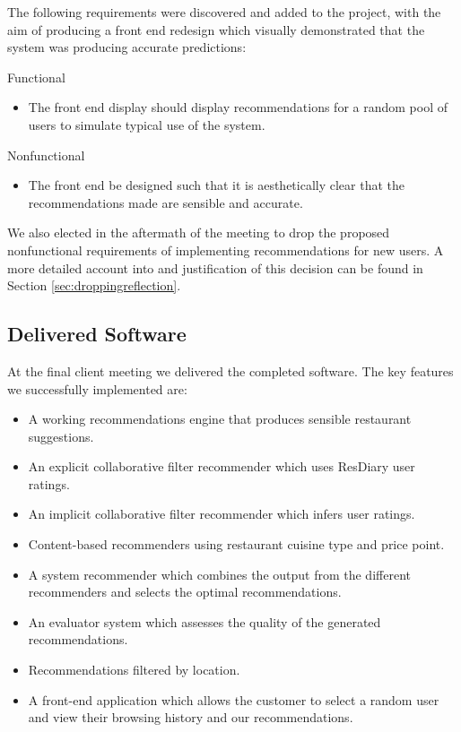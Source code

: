 \documentclass{l3proj}
\begin{document}
The following requirements were discovered and added to the project, with the aim of producing a front end redesign which visually demonstrated that the system was producing accurate predictions:

Functional
\begin{itemize}
\item The front end display should display recommendations for a random pool of users to simulate typical use of the system.
\end{itemize}

Nonfunctional
\begin{itemize}
\item The front end be designed such that it is aesthetically clear that the recommendations made are sensible and accurate.
\end{itemize}

We also elected in the aftermath of the meeting to drop the proposed nonfunctional requirements of implementing recommendations for new users. A more detailed account into and justification of this decision can be found in Section \ref{sec:droppingreflection}.

\subsection{Delivered Software}
\label{sec:finsoftware}

At the final client meeting we delivered the completed software. The key features we successfully implemented are:

\begin{itemize}
\item A working recommendations engine that produces sensible restaurant suggestions. 
\item An explicit collaborative filter recommender which uses ResDiary user ratings.
\item An implicit collaborative filter recommender which infers user ratings.
\item Content-based recommenders using restaurant cuisine type and price point.
\item A system recommender which combines the output from the different recommenders and selects the optimal recommendations.
\item An evaluator system which assesses the quality of the generated recommendations.
\item Recommendations filtered by location. 
\item A front-end application which allows the customer to select a random user and view their browsing history and our recommendations.
\end{itemize}
\end{document}
